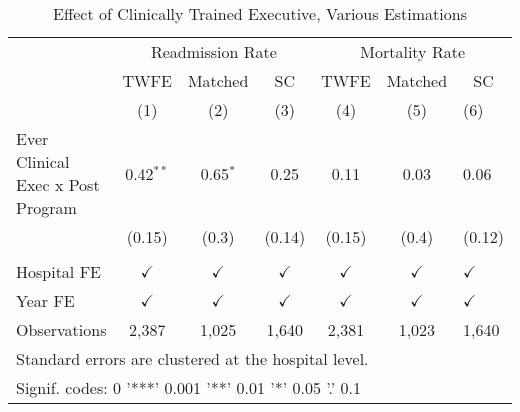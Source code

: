 \begin{table}[ht!]

\caption{\label{tab:main_twfe_match}Effect of Clinically Trained Executive, Various Estimations}
\centering
\begin{tabular}[t]{lcccccl}
\toprule
\multicolumn{1}{c}{} & \multicolumn{3}{c}{Readmission Rate} & \multicolumn{3}{c}{Mortality Rate} \\
\cmidrule(l{3pt}r{3pt}){2-4} \cmidrule(l{3pt}r{3pt}){5-7}
\multicolumn{1}{c}{ } & \multicolumn{1}{c}{TWFE} & \multicolumn{1}{c}{Matched} & \multicolumn{1}{c}{SC} & \multicolumn{1}{c}{TWFE} & \multicolumn{1}{c}{Matched} & \multicolumn{1}{c}{SC} \\
\cmidrule(l{3pt}r{3pt}){2-2} \cmidrule(l{3pt}r{3pt}){3-3} \cmidrule(l{3pt}r{3pt}){4-4} \cmidrule(l{3pt}r{3pt}){5-5} \cmidrule(l{3pt}r{3pt}){6-6} \cmidrule(l{3pt}r{3pt}){7-7}
 & (1) & (2) & (3) & (4) & (5) & (6)\\
\midrule
Ever Clinical Exec x Post Program & 0.42$^{**}$ & 0.65$^{*}$ & 0.25 & 0.11 & 0.03 & 0.06\\
 & (0.15) & (0.3) & (0.14) & (0.15) & (0.4) & (0.12)\\
 &  &  &  &  &  & \\
Hospital FE & $\checkmark$ & $\checkmark$ & $\checkmark$ & $\checkmark$ & $\checkmark$ & $\checkmark$\\
Year FE & $\checkmark$ & $\checkmark$ & $\checkmark$ & $\checkmark$ & $\checkmark$ & $\checkmark$\\
\addlinespace
Observations & 2,387 & 1,025 & 1,640 & 2,381 & 1,023 & 1,640\\
\bottomrule
\multicolumn{7}{l}{\textsuperscript{} Standard errors are clustered at the hospital level.}\\
\multicolumn{7}{l}{\textsuperscript{} Signif. codes: 0 '***' 0.001 '**' 0.01 '*' 0.05 '.' 0.1}\\
\end{tabular}
\end{table}
